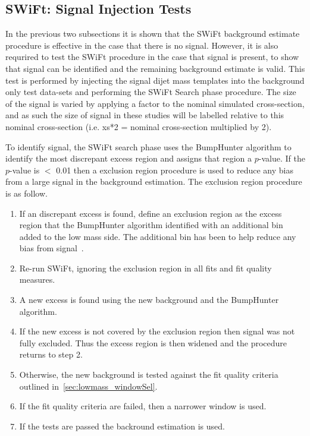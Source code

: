 \FloatBarrier

\subsection{SWiFt: Signal Injection Tests}
\label{sec:SWiFt_signalInj}


In the previous two subsections it is shown that the SWiFt background estimate procedure is effective in the case that there is no signal.
However, it is also requrired to test the SWiFt procedure in the case that signal is present, to show that signal can be identified and the remaining background estimate is valid.
This test is performed by injecting the signal dijet mass templates into the background only test data-sets and performing the SWiFt Search phase procedure.
The size of the signal is varied by applying a factor to the nominal simulated cross-section,
and as such the size of signal in these studies will be labelled relative to this nominal cross-section (i.e. xs*2 = nominal cross-section multiplied by 2).

To identify signal,
the SWiFt search phase uses the {\sc BumpHunter} algorithm to identify the most discrepant excess region and assigns that region a \mbox{$p$-value}.
If the \mbox{$p$-value} is $<$ 0.01 then a exclusion region procedure is used to reduce any bias from a large signal in the background estimation.
The exclusion region procedure is as follow.
\begin{enumerate}[leftmargin=*]
\item If an discrepant excess is found, define an exclusion region as the excess
  region that the {\sc BumpHunter} algorithm identified with an additional bin added to the low mass side.
  The additional bin has been to help reduce any bias from signal~\cite{dijet-mori16_paper}.
\item Re-run SWiFt, ignoring the exclusion region in all fits and fit quality measures.
\item A new excess is found using the new background and the {\sc BumpHunter} algorithm.
\item If the new excess is not covered by the exclusion region then signal was not fully excluded.
  Thus the excess region is then widened and the procedure returns to step 2.
\item Otherwise, the new background is tested against the fit quality criteria outlined in~\ref{sec:lowmass_windowSel}.
\item If the fit quality criteria are failed, then a narrower window is used.
\item If the tests are passed the backround estimation is used.
\end{enumerate}
 
